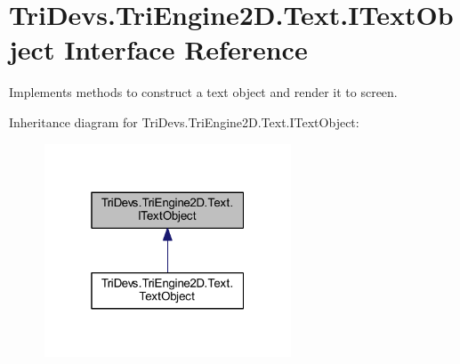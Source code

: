 \hypertarget{interface_tri_devs_1_1_tri_engine2_d_1_1_text_1_1_i_text_object}{\section{Tri\-Devs.\-Tri\-Engine2\-D.\-Text.\-I\-Text\-Object Interface Reference}
\label{interface_tri_devs_1_1_tri_engine2_d_1_1_text_1_1_i_text_object}
}


Implements methods to construct a text object and render it to screen.  




Inheritance diagram for Tri\-Devs.\-Tri\-Engine2\-D.\-Text.\-I\-Text\-Object\-:
\nopagebreak
\begin{figure}[H]
\begin{center}
\leavevmode
\includegraphics[width=208pt]{interface_tri_devs_1_1_tri_engine2_d_1_1_text_1_1_i_text_object__inherit__graph}
\end{center}
\end{figure}
